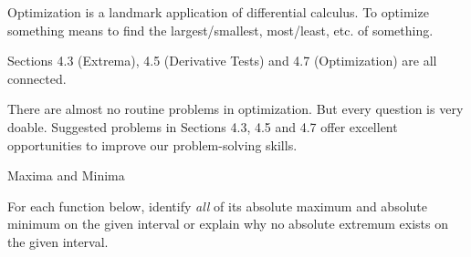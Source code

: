 \documentclass[../main.tex]{subfiles}
\begin{document}
Optimization is a landmark application of differential calculus.  
To optimize something means to find the largest/smallest, most/least, etc. of something. 

Sections 4.3 (Extrema), 4.5 (Derivative Tests) and 4.7 (Optimization) are all connected.

\faExclamationTriangle{} There are almost no routine problems in optimization. But every question is very doable. Suggested problems in Sections 4.3, 4.5 and 4.7 offer excellent opportunities to improve our problem-solving skills.

\begin{lesson}{Maxima and Minima}

  \begin{example} \label{ex:abs-extrema}
    For each function below, identify \emph{all} of its absolute maximum and absolute minimum on the given interval or explain why no absolute extremum exists on the given interval.


\end{example}
\end{lesson}
\end{document}
